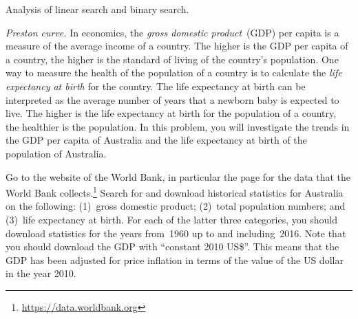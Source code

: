 \documentclass[a4paper,oneside,12pt]{article}
\begin{document}
\begin{problem}
\item Analysis of linear search and binary search.

\item\emph{Preston curve.}
  In economics, the \emph{gross domestic product}~(GDP) per capita is
  a measure of the average income of a country.  The higher is the GDP
  per capita of a country, the higher is the standard of living of the
  country's population.  One way to measure the health of the
  population of a country is to calculate the
  \emph{life expectancy at birth} for the country.  The life
  expectancy at birth can be interpreted as the average number of
  years that a newborn baby is expected to live.  The higher is the
  life expectancy at birth for the population of a country, the
  healthier is the population.  In this problem, you will investigate
  the trends in the GDP per capita of Australia and the life
  expectancy at birth of the population of Australia.
  \begin{packedenum}
  \item\label{subprob:logarithm:Australia_data}
    Go to the website of the World Bank, in particular the page for
    the data that the World Bank collects.\footnote{
      \url{https://data.worldbank.org}
    }
    Search for and download historical statistics for Australia on the
    following: (1)~gross domestic product; (2)~total population
    numbers; and (3)~life expectancy at birth.  For each of the latter
    three categories, you should download statistics for the years
    from~1960 up to and including~2016.  Note that you should download
    the GDP with ``constant 2010 US\$''.  This means that the GDP has
    been adjusted for price inflation in terms of the value of the US
    dollar in the year 2010.


\end{packedenum}
\end{problem}
\end{document}
